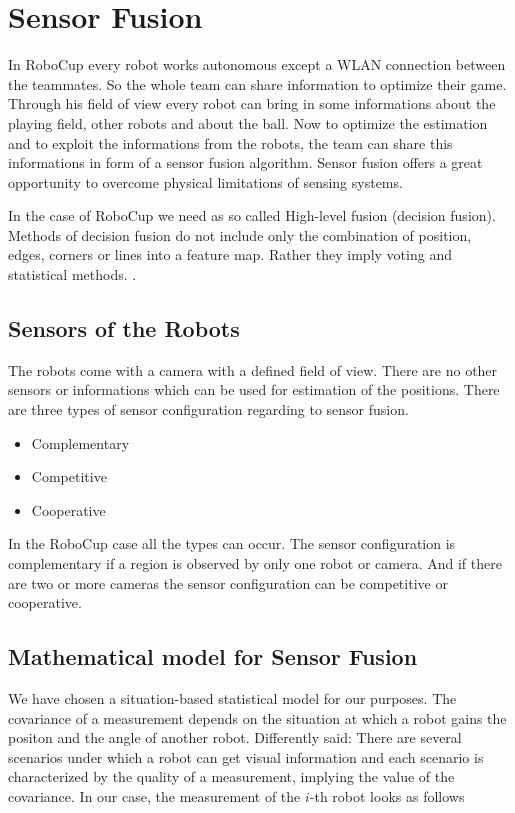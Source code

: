 
\chapter{Sensor Fusion}
In RoboCup every robot works autonomous except a WLAN connection between the teammates. So the whole team can share information to optimize their game.
Through his field of view every robot can bring in some informations about the playing field, other robots and about the ball. Now to optimize the estimation and to exploit the informations from the robots, the team can share this informations in form of a sensor fusion algorithm.
Sensor fusion offers a great opportunity to overcome physical limitations of sensing systems.\cite{IntroSF} 

In the case of RoboCup we need as so called High-level fusion (decision fusion). Methods of decision fusion do not include only the combination of position, edges, corners or lines into a feature map. Rather they imply voting and statistical methods. \cite{IntroSF}. 


\section{Sensors of the Robots}
The robots come with a camera with a defined field of view. There are no other sensors or informations which can be used for estimation of the positions. 
There are three types of sensor configuration regarding to sensor fusion. \cite{IntroSF}
\begin{itemize}
	\item Complementary
	\item Competitive
	\item Cooperative
\end{itemize}
In the RoboCup case all the types can occur. The sensor configuration is complementary if a region is  observed by only one robot or camera. And if there are two or more cameras the sensor configuration can be competitive or cooperative.


\section{Mathematical model for Sensor Fusion}

We have chosen a situation-based statistical model for our purposes. The covariance of a measurement depends on the situation at which a robot gains the positon and the angle of another robot. Differently said: There are several scenarios under which a robot can get visual information and each scenario is characterized by the quality of a measurement, implying the value of the covariance. In our case, the measurement of the \(i\)-th robot looks as follows

